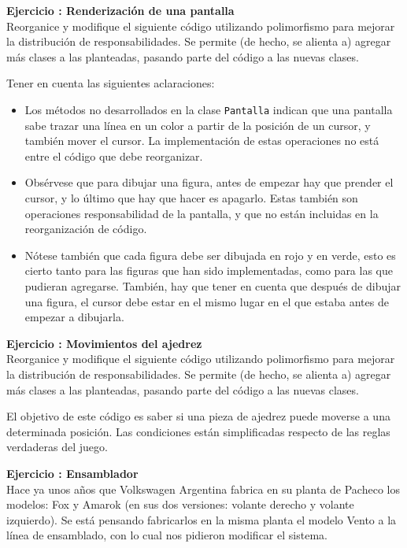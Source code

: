 \documentclass[a4paper,12pt]{article}
\newcounter{ej}
\newcounter{prte}
\newcommand{\ejercicio}[1]{\stepcounter{ej} \setcounter{prte}{0} \par \textbf{ Ejercicio \arabic{ej}: #1} \\ }
\begin{document}
\medskip\noindent




\ejercicio{Renderización de una pantalla}
Reorganice y modifique el siguiente código utilizando polimorfismo para mejorar la distribución de responsabilidades. Se permite (de hecho, se alienta a) agregar más clases a las planteadas, pasando parte del código a las nuevas clases.

Tener en cuenta las siguientes aclaraciones:
\begin{itemize}
	\item Los métodos no desarrollados en la clase \texttt{Pantalla} indican que una pantalla sabe trazar una línea en un color a partir de la posición de un cursor, y también mover el cursor. La implementación de estas operaciones no está entre el código que debe reorganizar.
	\item Obsérvese que para dibujar una figura, antes de empezar hay que prender el cursor, y lo último que hay que hacer es apagarlo. Estas también son operaciones responsabilidad de la pantalla, y que no están incluidas en la reorganización de código.
	\item Nótese también que cada figura debe ser dibujada en rojo y en verde, esto es cierto tanto para las figuras que han sido implementadas, como para las que pudieran agregarse. También, hay que tener en cuenta que después de dibujar una figura, el cursor debe estar en el mismo lugar en el que estaba antes de empezar a dibujarla.
\end{itemize}
\medskip\noindent



\ejercicio{Movimientos del ajedrez}
Reorganice y modifique el siguiente código utilizando polimorfismo para mejorar la distribución de responsabilidades. Se permite (de hecho, se alienta a) agregar más clases a las planteadas, pasando parte del código a las nuevas clases.

El objetivo de este código es saber si una pieza de ajedrez puede moverse a una determinada posición. Las condiciones están simplificadas respecto de las reglas verdaderas del juego.

\medskip\noindent


\ejercicio{Ensamblador}
Hace ya unos años que Volkswagen Argentina fabrica en su planta de Pacheco los modelos: Fox y Amarok (en sus dos versiones: volante derecho y volante izquierdo). Se está pensando fabricarlos en la misma planta el modelo Vento a la línea de ensamblado, con lo cual nos pidieron modificar el sistema.
\end{document}

